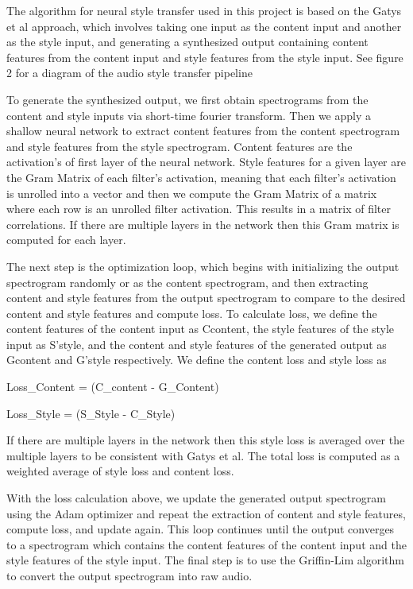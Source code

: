 \documentclass[10pt,twocolumn,letterpaper]{article}
\begin{document}
The algorithm for neural style transfer used in this project is based on the Gatys et al\cite{Authors00001} approach, which involves taking one input as the content input and another as the style input, and generating a synthesized output containing content features from the content input and style features from the style input. See figure 2 for a diagram of the audio style transfer pipeline

To generate the synthesized output, we first obtain spectrograms from the content and style inputs via short-time fourier transform. Then we apply a shallow neural network to extract content features from the content spectrogram and style features from the style spectrogram. Content features are the activation's of first layer of the neural network. Style features for a given layer are the Gram Matrix of each filter’s activation, meaning that each filter’s activation is unrolled into a vector and then we compute the Gram Matrix of a matrix where each row is an unrolled filter activation. This results in a matrix of filter correlations. If there are multiple layers in the network then this Gram matrix is 
computed for each layer.

The next step is the optimization loop, which begins with initializing the output spectrogram randomly or as the content spectrogram, and then extracting content and style features from the output spectrogram to compare to the desired content and style features and compute loss. To calculate loss, we define the content features of the content input as Ccontent, the style features of the style input as S'style, and the content and style features of the generated output as Gcontent and G'style respectively. We define the content loss  and style loss as

Loss_Content = (C_content - G_Content)

Loss_Style = (S_Style - C_Style)
 
If there are multiple layers in the network then this style loss is averaged over the multiple layers to be consistent with Gatys et al. The total loss is computed as a weighted average of style loss and content loss.

With the loss calculation above, we update the generated output spectrogram using the Adam optimizer \cite{Authors00008}and repeat the extraction of content and style features, compute loss, and update again. This loop continues until the output converges to a spectrogram which contains the content features of the content input and the style features of the style input. The final step is to use the Griffin-Lim algorithm\cite{Authors00004} to convert the output spectrogram into raw audio.
\end{document}
